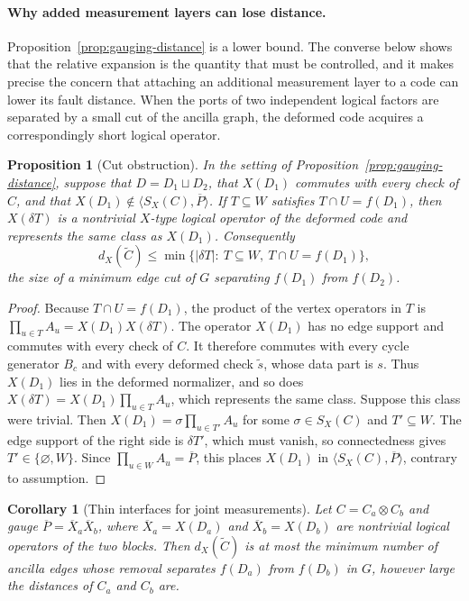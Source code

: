 \documentclass[aps,prx,reprint,superscriptaddress,nofootinbib,floatfix,longbibliography]{revtex4-2}
\newtheorem{proposition}[theorem]{Proposition}
\newtheorem{corollary}[theorem]{Corollary}
\theoremstyle{definition}
\begin{document}
\paragraph{Why added measurement layers can lose distance.}
Proposition~\ref{prop:gauging-distance} is a lower bound.  The converse below
shows that the relative expansion is the quantity that must be controlled, and
it makes precise the concern that attaching an additional measurement layer to
a code can lower its fault distance.  When the ports of two independent
logical factors are separated by a small cut of the ancilla graph, the
deformed code acquires a correspondingly short logical operator.

\begin{proposition}[Cut obstruction]
\label{prop:cut-obstruction}
In the setting of Proposition~\ref{prop:gauging-distance}, suppose that
$D=D_1\sqcup D_2$, that $X(D_1)$ commutes with every check of $C$, and that
$X(D_1)\notin\langle S_X(C),\overline P\rangle$.  If $T\subseteq W$ satisfies
$T\cap U=f(D_1)$, then $X(\delta T)$ is a nontrivial $X$-type logical operator
of the deformed code and represents the same class as $X(D_1)$.  Consequently
\begin{equation}
 d_X(\widetilde C)\leq
 \min\bigl\{|\delta T|:\ T\subseteq W,\ T\cap U=f(D_1)\bigr\},
 \label{eq:cut-obstruction}
\end{equation}
the size of a minimum edge cut of $G$ separating $f(D_1)$ from $f(D_2)$.
\end{proposition}

\begin{proof}
Because $T\cap U=f(D_1)$, the product of the vertex operators in $T$ is
$\prod_{u\in T}A_u=X(D_1)X(\delta T)$.  The operator $X(D_1)$ has no edge
support and commutes with every check of $C$.  It therefore commutes with
every cycle generator $B_c$ and with every deformed check $\widetilde s$,
whose data part is $s$.  Thus $X(D_1)$ lies in the deformed normalizer, and
so does $X(\delta T)=X(D_1)\prod_{u\in T}A_u$, which represents the same
class.  Suppose this class were trivial.  Then $X(D_1)=\sigma\prod_{u\in
T'}A_u$ for some $\sigma\in S_X(C)$ and $T'\subseteq W$.  The edge support of
the right side is $\delta T'$, which must vanish, so connectedness gives
$T'\in\{\varnothing,W\}$.  Since $\prod_{u\in W}A_u=\overline P$, this
places $X(D_1)$ in $\langle S_X(C),\overline P\rangle$, contrary to
assumption.
\end{proof}

\begin{corollary}[Thin interfaces for joint measurements]
\label{cor:thin-interface}
Let $C=C_a\otimes C_b$ and gauge $\overline P=\overline X_a\overline X_b$,
where $\overline X_a=X(D_a)$ and $\overline X_b=X(D_b)$ are nontrivial
logical operators of the two blocks.  Then $d_X(\widetilde C)$ is at most the
minimum number of ancilla edges whose removal separates $f(D_a)$ from
$f(D_b)$ in $G$, however large the distances of $C_a$ and $C_b$ are.
\end{corollary}
\end{document}

